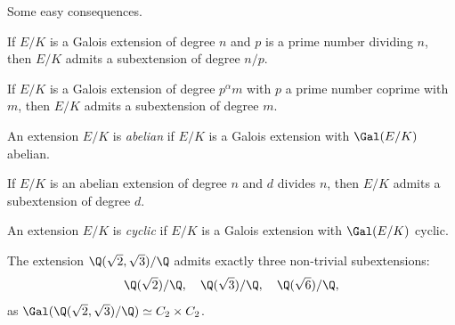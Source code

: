 Some easy consequences.

\begin{exercise}
\label{xca:Cauchy+Galois}
    If $E/K$ is a Galois extension of degree $n$ and
    $p$ is a prime number dividing $n$, then $E/K$ admits
    a subextension of degree $n/p$. 
\end{exercise}
    
\begin{exercise}
\label{xca:Sylow+Galois}
    If $E/K$ is a Galois extension of degree $p^\alpha m$ with
    $p$ a prime number coprime with $m$, then $E/K$ admits 
    a subextension of degree $m$. 
\end{exercise}

\begin{definition}
    An extension $E/K$ is \emph{abelian} if $E/K$ is a Galois extension
    with $\Gal(E/K)$ abelian.
\end{definition}

\begin{exercise}
    If $E/K$ is an abelian extension of degree $n$ and $d$ divides
    $n$, then $E/K$ admits a subextension of degree $d$. 
\end{exercise}

\begin{definition}
    An extension $E/K$ is \emph{cyclic} if $E/K$ is 
    a Galois extension with $\Gal(E/K)$ cyclic. 
\end{definition}

\begin{example}
    The extension $\Q(\sqrt{2},\sqrt{3})/\Q$ admits
    exactly three non-trivial subextensions: 
    \[
    \Q(\sqrt{2})/\Q,
    \quad
    \Q(\sqrt{3})/\Q,
    \quad 
    \Q(\sqrt{6})/\Q,
    \]
    as $\Gal(\Q(\sqrt{2},\sqrt{3})/\Q)\simeq C_2\times C_2$. 
\end{example}

